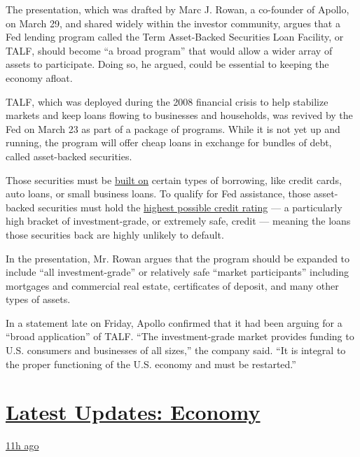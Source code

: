 The presentation, which was drafted by Marc J. Rowan, a co-founder of
Apollo, on March 29, and shared widely within the investor community,
argues that a Fed lending program called the Term Asset-Backed
Securities Loan Facility, or TALF, should become ``a broad program''
that would allow a wider array of assets to participate. Doing so, he
argued, could be essential to keeping the economy afloat.

TALF, which was deployed during the 2008 financial crisis to help
stabilize markets and keep loans flowing to businesses and households,
was revived by the Fed on March 23 as part of a package of programs.
While it is not yet up and running, the program will offer cheap loans
in exchange for bundles of debt, called asset-backed securities.

Those securities must be
\href{https://www.federalreserve.gov/newsevents/pressreleases/files/monetary20200323b3.pdf}{built
on} certain types of borrowing, like credit cards, auto loans, or small
business loans. To qualify for Fed assistance, those asset-backed
securities must hold the
\href{https://www.federalreserve.gov/monetarypolicy/talf.htm}{highest
possible credit rating} --- a particularly high bracket of
investment-grade, or extremely safe, credit --- meaning the loans those
securities back are highly unlikely to default.

In the presentation, Mr. Rowan argues that the program should be
expanded to include ``all investment-grade'' or relatively safe ``market
participants'' including mortgages and commercial real estate,
certificates of deposit, and many other types of assets.

In a statement late on Friday, Apollo confirmed that it had been arguing
for a ``broad application'' of TALF. ``The investment-grade market
provides funding to U.S. consumers and businesses of all sizes,'' the
company said. ``It is integral to the proper functioning of the U.S.
economy and must be restarted.''

\hypertarget{latest-updates-economy}{%
\section{\texorpdfstring{\href{https://www.nytimes3xbfgragh.onion/live/2020/08/03/business/stock-market-today-coronavirus?action=click\&pgtype=Article\&state=default\&region=MAIN_CONTENT_1\&context=storylines_live_updates}{Latest
Updates:
Economy}}{Latest Updates: Economy}}\label{latest-updates-economy}}

\href{https://www.nytimes3xbfgragh.onion/live/2020/08/03/business/stock-market-today-coronavirus?action=click\&pgtype=Article\&state=default\&region=MAIN_CONTENT_1\&context=storylines_live_updates\#the-chicago-fed-president-says-its-up-to-congress-to-save-the-economy}{11h
ago}

